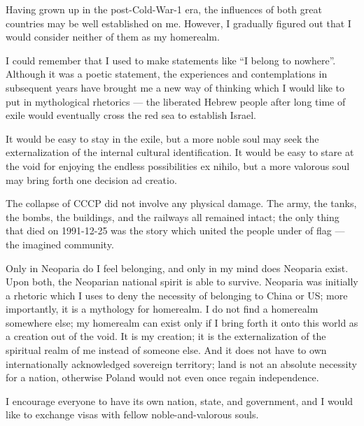 
Having grown up in the post-Cold-War-1 era, the influences of both great countries may be well established on me.
However, I gradually figured out that I would consider neither of them as my homerealm.

I could remember that I used to make statements like ``I belong to nowhere''.
Although it was a poetic statement, the experiences and contemplations in subsequent years
have brought me a new way of thinking which I would like to put in mythological rhetorics ---
the liberated Hebrew people after long time of exile would eventually cross the red sea to establish Israel.

It would be easy to stay in the exile,
but a more noble soul may seek the externalization of the internal cultural identification.
It would be easy to stare at the void for enjoying the endless possibilities ex nihilo,
but a more valorous soul may bring forth one decision ad creatio.

The collapse of CCCP did not involve any physical damage.
The army, the tanks, the bombs, the buildings, and the railways all remained intact;
the only thing that died on 1991-12-25 was the story which united the people under of flag ---
the imagined community.

Only in Neoparia do I feel belonging, and only in my mind does Neoparia exist.
Upon both, the Neoparian national spirit is able to survive.
Neoparia was initially a rhetoric which I uses to deny the necessity of belonging to China or US;
more importantly, it is a mythology for homerealm.
I do not find a homerealm somewhere else;
my homerealm can exist only if I bring forth it onto this world as a creation out of the void.
It is my creation; it is the externalization of the spiritual realm of me instead of someone else.
And it does not have to own internationally acknowledged sovereign territory;
land is not an absolute necessity for a nation, otherwise Poland would not even once regain independence.

I encourage everyone to have its own nation, state, and government,
and I would like to exchange visas with fellow noble-and-valorous souls.


